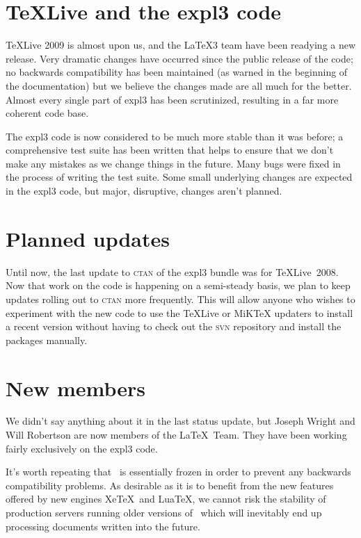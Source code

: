 \documentclass{ltnews}
\begin{document}
\maketitle

\section{\TeX Live and the \textsf{expl3} code}

\TeX Live 2009 is almost upon us, and the \LaTeX3 team have been
readying a new release. Very dramatic changes have occurred since the
public release of the code; no backwards compatibility has been
maintained (as warned in the beginning of the documentation) but we
believe the changes made are all much for the better. Almost every
single part of \textsf{expl3} has been scrutinized, resulting in a far
more coherent code base.

The \textsf{expl3} code is now considered to be much more stable than
it was before; a comprehensive test suite has been written that helps
to ensure that we don't make any mistakes as we change things in the
future. Many bugs were fixed in the process of writing the test
suite. Some small underlying changes are expected in the
\textsf{expl3} code, but major, disruptive, changes aren't planned.

\section{Planned updates}

Until now, the last update to \textsc{ctan} of the \textsf{expl3}
bundle was for \TeX Live~2008. Now that work on the code is happening
on a semi-steady basis, we plan to keep updates rolling out to
\textsc{ctan} more frequently. This will allow anyone who wishes to
experiment with the new code to use the \TeX Live or MiK\TeX 
updaters to install a recent version without having to check out the
\textsc{svn} repository and install the packages manually.

\section{New members}

We didn't say anything about it in the last status update, but Joseph
Wright and Will Robertson are now members of the \LaTeX\ Team. They
have been working fairly exclusively on the \textsf{expl3} code. 

It's worth repeating that \LaTeXe\ is essentially frozen in order to
prevent any backwards compatibility problems. As desirable as it is
to benefit from the new features offered by new engines Xe\TeX\ and
Lua\TeX, we cannot risk the stability of production servers running
older versions of \LaTeXe\ which will inevitably end up processing
documents written into the future.
\end{document}
